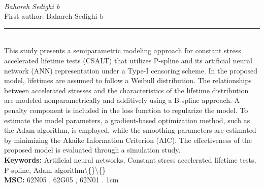 \documentclass[10pt,twoside]{article}
\begin{document}
\noindent\begin{minipage}[t][\textheight]{\textwidth}
\\[0.35em]
{\itshape Bahareh Sedighi b}\\[0.2em]
{\footnotesize First author: Bahareh Sedighi b}\\[0.45em]
\noindent\rule{\textwidth}{0.3pt}\\[0.4em]
{\footnotesize  This study presents a semiparametric modeling approach for constant stress accelerated lifetime tests (CSALT) that utilizes P-spline and its artificial neural network (ANN) representation under a Type-I censoring scheme. In the proposed model, lifetimes are assumed to follow a Weibull distribution. The relationships between accelerated stresses and the characteristics of the lifetime distribution are modeled nonparametrically and additively using a B-spline approach. A penalty component is included in the loss function to regularize the model. To estimate the model parameters, a gradient-based optimization method, such as the Adam algorithm, is employed, while the smoothing parameters are estimated by minimizing the Akaike Information Criterion (AIC). The effectiveness of the proposed model is evaluated through a simulation study.}\\[0.4em]
{\footnotesize\bfseries Keywords:} {\footnotesize Artificial neural networks, Constant stress accelerated lifetime tests, P-spline, Adam algorithm\textbackslash\{\}\textbackslash\{\}}\\[0.15em]
{\footnotesize\bfseries MSC:} {\footnotesize 62N05 , 62G05 , 62N01 . 1cm}\\
\vfill
\end{minipage}
\newpage
\end{document}
